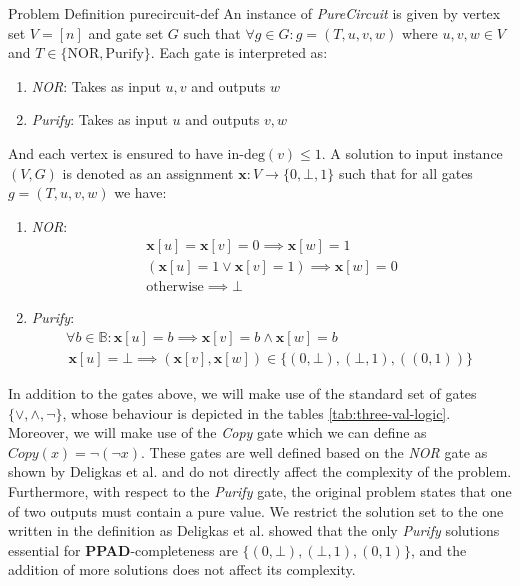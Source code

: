 \begin{definitionbox}{ Problem Definition \cite{deligkas_PureCircuitTightInapproximability_2024}}{purecircuit-def}
    An instance of \textit{PureCircuit} is given by vertex set $V= [n]$ and gate set $G$ such that
    $\forall g \in G: g=(T,u,v,w)$ where $u,v,w \in V$ and $T \in \{\text{NOR}, \text{Purify}\}$.
    Each gate is interpreted as:
    \begin{enumerate}
        \item \textit{NOR}: Takes as input $u,v$ and outputs $w$
        \item \textit{Purify}: Takes as input $u$ and outputs $v,w$
    \end{enumerate}
    And each vertex is ensured to have $\text{in-deg}(v) \leq 1$.
    A solution to input instance $(V,G)$ is denoted as an assignment $\mathbf{x} : V \to \{0, \bot, 1\}$
    such that for all gates $g = (T,u,v,w)$ we have:
    \begin{enumerate}
        \item \textit{NOR}:
              \begin{gather*}
                  \mathbf{x}[u] = \mathbf{x}[v] = 0 \implies \mathbf{x}[w] = 1\\
                  (\mathbf{x}[u] =1 \vee \mathbf{x}[v] =1) \implies \mathbf{x}[w] = 0 \\
                  \text{otherwise} \implies \bot
              \end{gather*}

        \item \textit{Purify}:
              \begin{gather*}
                  \forall b \in \mathbb{B}: \mathbf{x}[u] = b \implies \mathbf{x}[v] = b \wedge \mathbf{x}[w] =  b\\
                  \, \mathbf{x}[u] = \bot \implies (\mathbf{x}[v], \mathbf{x}[w]) \in \{(0, \bot),
                  (\bot, 1), ((0, 1))\}
                  \, \, \end{gather*}
    \end{enumerate}
\end{definitionbox}

In addition to the gates above, we will make use of the standard set of gates $\{\vee, \wedge, \neg\}$,
whose behaviour is depicted in the tables \ref{tab:three-val-logic}.
Moreover, we will make use of the \textit{Copy} gate which we can define as $\textit{Copy}(x) = \neg (\neg x)$.
These gates are well defined based on the \textit{NOR} gate as shown by Deligkas et al. \cite{deligkas_PureCircuitTightInapproximability_2024}
and do not directly affect the complexity of the problem.
Furthermore, with respect to the \textit{Purify} gate,
the original problem states that one of two outputs must contain a pure value.
We restrict the solution set to the one written in the definition as
Deligkas et al. \cite{deligkas_PureCircuitTightInapproximability_2024} showed that the only \textit{Purify} solutions essential
for \textbf{PPAD}-completeness are $\{(0,\bot), (\bot,1), (0,1)\}$, and the addition of more solutions does not affect its complexity.


